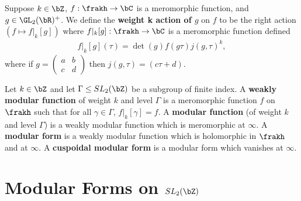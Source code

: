 \begin{lem}\label{lem:weight-k-action-on-mero-func}
	Suppose $k \in \bZ$, $f:\frakh \to \bC$ is a meromorphic function, and $g \in \GL_2(\bR)^+$. We define the \textbf{weight k action of $g$} on $f$ to be the right action $\left(f \mapsto f|_k[g]\right)$ where $f|_k[g]:\frakh \to \bC$ is a meromorphic function defined
	\begin{align*}
		f |_k[g](\tau) = \det(g) f(g\tau)j(g,\tau)^k,
	\end{align*}
	where if $g = \begin{pmatrix}a & b \\ c & d\end{pmatrix}$ then $j(g,\tau) = (c\tau + d)$.
\end{lem}

\begin{defn}\label{defn:weakly-mod-func-to-mod-forms}
	Let $k \in \bZ$ and let $\Gamma \leq SL_2(\bZ)$ be a subgroup of finite index. A \textbf{weakly modular function} of weight $k$ and level $\Gamma$ is a meromorphic function $f$ on $\frakh$ such that for all  $\gamma \in \Gamma$, $f|_k[\gamma] = f$. A \textbf{modular function} (of weight $k$ and level $\Gamma$) is a weakly modular function which is meromorphic at $\infty$. A \textbf{modular form} is a weakly modular function which is holomorphic in $\frakh$ and at $\infty$. A \textbf{cuspoidal modular form} is a modular form which vanishes at $\infty$. 
\end{defn}

\section{Modular Forms on \texorpdfstring{$SL_2(\bZ)$}{the Special Linear Group}}



